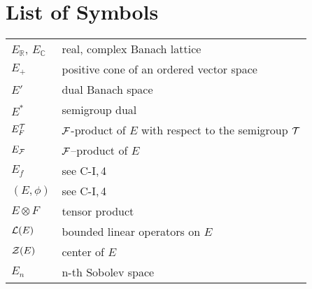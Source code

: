 
\setcounter{chapter}{0}
\renewcommand\thepart{}
\renewcommand\thechapter{}
\chapter*{List of Symbols}
\begin{longtable}{p{}p{}}%


$E_{\mathbb{R}}$, $E_{\mathbb{C}}$ & real, complex Banach lattice \\ %
$E_{+}$ & positive cone of an ordered vector space \\ %
$E'$ & dual Banach space\\ %
$E^{*}$ & semigroup dual \\ %
$E_F^{\mathcal{T}}$ & $\mathcal{F}$-product of $E$ with respect to the semigroup $\mathcal{T}$ \\ %
$E_{\mathcal{F}}$ & $\mathcal{F}$--product of $E$ \\ %
$E_f$ & see C-I,\,4 \\ %
$(E,\phi)$ &  see C-I,\,4 \\ %
$E \otimes F$ & tensor product \\ %
$\mathcal{L}(E)$ & bounded linear operators on $E$ \\ %
$\mathcal{Z}(E)$ & center of $E$ \\ %
$E_n$ & n-th Sobolev space \\ %

\end{longtable}
